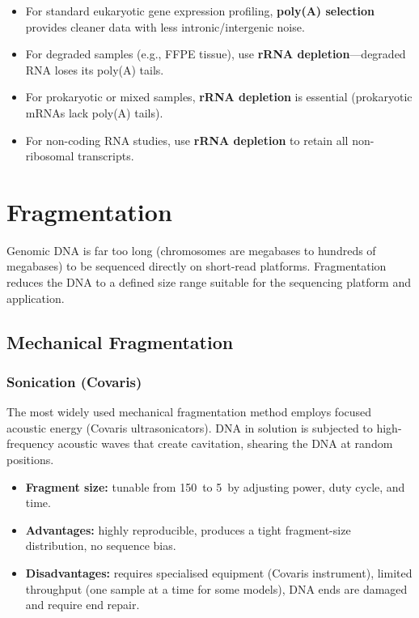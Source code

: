 \begin{tipbox}[title={Choosing Between Poly(A) Selection and rRNA Depletion}]
\begin{itemize}[nosep]
  \item For standard eukaryotic gene expression profiling, \textbf{poly(A) selection} provides cleaner data with less intronic/intergenic noise.
  \item For degraded samples (e.g., FFPE tissue), use \textbf{rRNA depletion}---degraded RNA loses its poly(A) tails.
  \item For prokaryotic or mixed samples, \textbf{rRNA depletion} is essential (prokaryotic mRNAs lack poly(A) tails).
  \item For non-coding RNA studies, use \textbf{rRNA depletion} to retain all non-ribosomal transcripts.
\end{itemize}
\end{tipbox}


\section{Fragmentation}
\label{sec:fragmentation}

Genomic DNA is far too long (chromosomes are megabases to hundreds of megabases) to be sequenced directly on short-read platforms. Fragmentation reduces the DNA to a defined size range suitable for the sequencing platform and application.

\subsection{Mechanical Fragmentation}

\subsubsection{Sonication (Covaris)}

The most widely used mechanical fragmentation method employs focused acoustic energy (Covaris ultrasonicators). DNA in solution is subjected to high-frequency acoustic waves that create cavitation, shearing the DNA at random positions.

\begin{itemize}[nosep]
  \item \textbf{Fragment size:} tunable from 150\basepair\ to 5\kilobase\ by adjusting power, duty cycle, and time.
  \item \textbf{Advantages:} highly reproducible, produces a tight fragment-size distribution, no sequence bias.
  \item \textbf{Disadvantages:} requires specialised equipment (Covaris instrument), limited throughput (one sample at a time for some models), DNA ends are damaged and require end repair.
\end{itemize}

